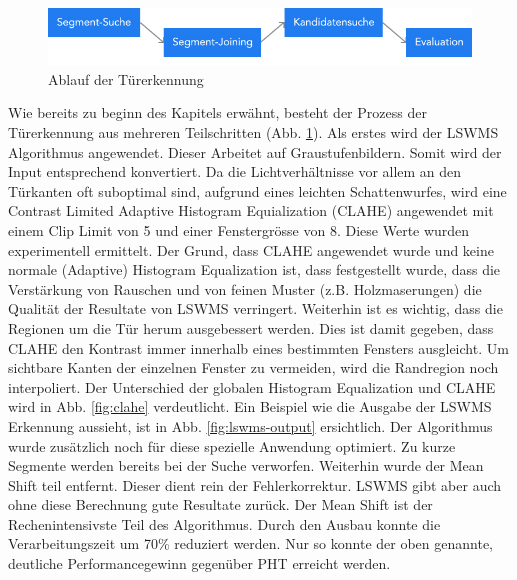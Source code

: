 \begin{figure}[!ht]
\centering
\includegraphics[width=\textwidth]{images/door-detection} 
\caption{Ablauf der Türerkennung}
\label{fig:door-detection}
\end{figure}
\noindent
Wie bereits zu beginn des Kapitels erwähnt, besteht der Prozess der Türerkennung aus mehreren Teilschritten (Abb. \ref{fig:door-detection}). Als erstes wird der LSWMS Algorithmus angewendet. Dieser Arbeitet auf Graustufenbildern. Somit wird der Input entsprechend konvertiert. Da die Lichtverhältnisse vor allem an den Türkanten oft suboptimal sind, aufgrund eines leichten Schattenwurfes, wird eine Contrast Limited Adaptive Histogram Equialization (CLAHE) angewendet mit einem Clip Limit von 5 und einer Fenstergrösse von 8. Diese Werte wurden experimentell ermittelt. Der Grund, dass CLAHE angewendet wurde und keine normale (Adaptive) Histogram Equalization ist, dass festgestellt wurde, dass die Verstärkung von Rauschen und von feinen Muster (z.B. Holzmaserungen) die Qualität der Resultate von LSWMS verringert. Weiterhin ist es wichtig, dass die Regionen um die Tür herum ausgebessert werden. Dies ist damit gegeben, dass CLAHE den Kontrast immer innerhalb eines bestimmten Fensters ausgleicht. Um sichtbare Kanten der einzelnen Fenster zu vermeiden, wird die Randregion noch interpoliert. Der Unterschied der globalen Histogram Equalization und CLAHE wird in Abb. \ref{fig:clahe} verdeutlicht. Ein Beispiel wie die Ausgabe der LSWMS Erkennung aussieht, ist in Abb. \ref{fig:lswms-output} ersichtlich. Der Algorithmus wurde zusätzlich noch für diese spezielle Anwendung optimiert. Zu kurze Segmente werden bereits bei der Suche verworfen. Weiterhin wurde der Mean Shift teil entfernt. Dieser dient rein der Fehlerkorrektur. LSWMS gibt aber auch ohne diese Berechnung gute Resultate zurück. Der Mean Shift ist der Rechenintensivste Teil des Algorithmus. Durch den Ausbau konnte die Verarbeitungszeit um 70\% reduziert werden. Nur so konnte der oben genannte, deutliche Performancegewinn gegenüber PHT erreicht werden.

